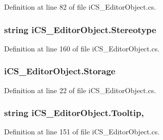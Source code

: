 Definition at line 82 of file i\+C\+S\+\_\+\+Editor\+Object.\+cs.

\hypertarget{classi_c_s___editor_object_aa54b2302d1b859231502b37e371fbb3c}{
\subsubsection[{Stereotype}]{\setlength{\rightskip}{0pt plus 5cm}string i\+C\+S\+\_\+\+Editor\+Object.\+Stereotype\hspace{0.3cm}{\ttfamily [get]}}}\label{classi_c_s___editor_object_aa54b2302d1b859231502b37e371fbb3c}


Definition at line 160 of file i\+C\+S\+\_\+\+Editor\+Object.\+cs.

\hypertarget{classi_c_s___editor_object_a74c2d3def2e003fb7a40cf394fbe54f1}{
\subsubsection[{Storage}]{ i\+C\+S\+\_\+\+Editor\+Object.\+Storage\hspace{0.3cm}{\ttfamily [get]}}}\label{classi_c_s___editor_object_a74c2d3def2e003fb7a40cf394fbe54f1}


Definition at line 22 of file i\+C\+S\+\_\+\+Editor\+Object.\+cs.

\hypertarget{classi_c_s___editor_object_a0973393c51a26df00b6e8f75b209ffb4}{
\subsubsection[{Tooltip}]{\setlength{\rightskip}{0pt plus 5cm}string i\+C\+S\+\_\+\+Editor\+Object.\+Tooltip\hspace{0.3cm}{\ttfamily [get]}, {\ttfamily [set]}}}\label{classi_c_s___editor_object_a0973393c51a26df00b6e8f75b209ffb4}


Definition at line 151 of file i\+C\+S\+\_\+\+Editor\+Object.\+cs.

